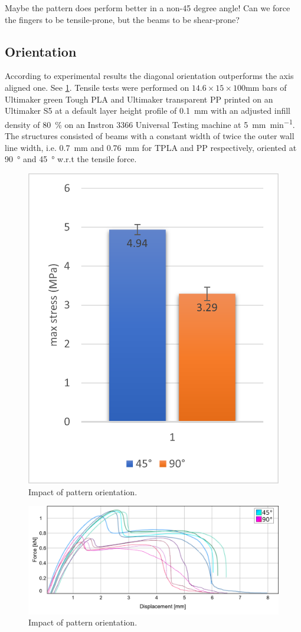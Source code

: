 Maybe the pattern does perform better in a non-45 degree angle!
Can we force the fingers to be tensile-prone, but the beams to be shear-prone?











\subsection{Orientation}
According to experimental results the diagonal orientation outperforms the axis aligned one.
See \cref{graph:45vs90}.
Tensile tests were performed on $14.6\times15\times100$\si{\milli\meter} bars of Ultimaker green Tough PLA and Ultimaker transparent PP
printed on an Ultimaker S5 at a default layer height profile of \SI{0.1}{\milli\meter} with an adjusted infill density of \SI{80}{\percent}
on an Instron 3366 Universal Testing machine at \SI{5}{\milli\meter\per\minute}.
The structures consisted of beams with a constant width of twice the outer wall line width, i.e. \SI{0.7}{\milli\meter} and \SI{0.76}{\milli\meter} for TPLA and PP respectively,
oriented at \SI{90}{\degree} and \SI{45}{\degree} w.r.t the tensile force.

\begin{figure}
	\centering
	\includegraphics[width=.5\columnwidth]{../sources/testing/45vs90.png}
	\caption{Impact of pattern orientation.}
	\label{graph:45vs90}
\end{figure}


\begin{figure}
	\centering
	\includegraphics[width=\columnwidth]{../sources/testing/45vs90_stress_strain.png}
	\caption{Impact of pattern orientation.}
	\label{graph:45vs90_stress_strain}
\end{figure}
